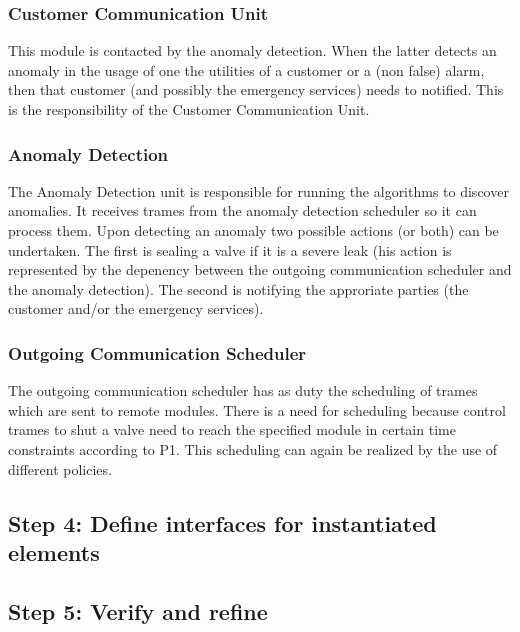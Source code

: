 \subsubsection{Customer Communication Unit}

\npar This module is contacted by the anomaly detection. When the latter detects
an anomaly in the usage of one the utilities of a customer or a (non false)
alarm, then that customer (and possibly the emergency services) needs to
notified. This is the responsibility of the Customer Communication Unit.

\subsubsection{Anomaly Detection}

\npar The Anomaly Detection unit is responsible for running the algorithms to
discover anomalies. It receives trames from the anomaly detection scheduler so
it can process them. Upon detecting an anomaly two possible actions (or both)
can be undertaken. The first is sealing a valve if it is a severe leak (his
action is represented by the depenency between the outgoing communication
scheduler and the anomaly detection). The second is notifying the approriate
parties (the customer and/or the emergency services).

\subsubsection{Outgoing Communication Scheduler}

\npar The outgoing communication scheduler has as duty the scheduling of
trames which are sent to remote modules. There is a need for scheduling because
control trames to shut a valve need to reach the specified module in certain
time constraints according to P1. This scheduling can again be realized by the
use of different policies.

\subsection{Step 4: Define interfaces for instantiated elements}
\label{add:it1/interfaces}



\subsection{Step 5: Verify and refine}
\label{add:it1/verification}

